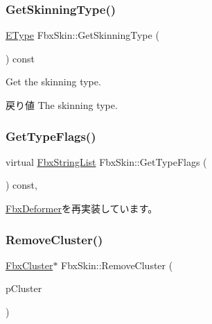 \subsubsection{\texorpdfstring{Get\+Skinning\+Type()}{GetSkinningType()}}
{\footnotesize\ttfamily \hyperlink{class_fbx_skin_aee398789ebed22fa97269a26c6049a16}{E\+Type} Fbx\+Skin\+::\+Get\+Skinning\+Type (\begin{DoxyParamCaption}{ }\end{DoxyParamCaption}) const}

Get the skinning type. \begin{DoxyReturn}{戻り値}
The skinning type. 
\end{DoxyReturn}
\mbox{\label{class_fbx_skin_a736228a80b5d0db0075527767286be2d}} 
\subsubsection{\texorpdfstring{Get\+Type\+Flags()}{GetTypeFlags()}}
{\footnotesize\ttfamily virtual \hyperlink{class_fbx_string_list}{Fbx\+String\+List} Fbx\+Skin\+::\+Get\+Type\+Flags (\begin{DoxyParamCaption}{ }\end{DoxyParamCaption}) const\hspace{0.3cm}{\ttfamily [protected]}, {\ttfamily [virtual]}}



\hyperlink{class_fbx_deformer_ac3f5a3eb2dda62397fc667004d798319}{Fbx\+Deformer}を再実装しています。

\mbox{\label{class_fbx_skin_a443fa63f322e84c08714eef77107f921}} 
\subsubsection{\texorpdfstring{Remove\+Cluster()}{RemoveCluster()}}
{\footnotesize\ttfamily \hyperlink{class_fbx_cluster}{Fbx\+Cluster}$\ast$ Fbx\+Skin\+::\+Remove\+Cluster (\begin{DoxyParamCaption}\item[{\hyperlink{class_fbx_cluster}{Fbx\+Cluster} $\ast$}]{p\+Cluster }\end{DoxyParamCaption})}


